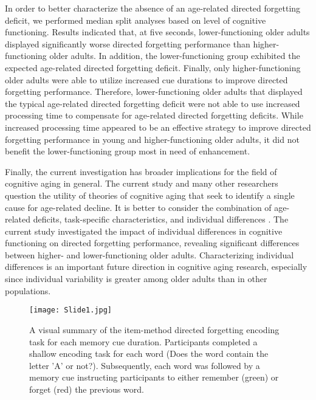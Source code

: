 \documentclass[man]{apa6}
\begin{document}
In order to better characterize the absence of an age-related directed forgetting deficit, we performed median split analyses based on level of cognitive functioning. Results indicated that, at five seconds, lower-functioning older adults displayed significantly worse directed forgetting performance than higher-functioning older adults. In addition, the lower-functioning group exhibited the expected age-related directed forgetting deficit. Finally, only higher-functioning older adults were able to utilize increased cue durations to improve directed forgetting performance. Therefore, lower-functioning older adults that displayed the typical age-related directed forgetting deficit were not able to use increased processing time to compensate for age-related directed forgetting deficits. While increased processing time appeared to be an effective strategy to improve directed forgetting performance in young and higher-functioning older adults, it did not benefit the lower-functioning group most in need of enhancement. 

Finally, the current investigation has broader implications for the field of cognitive aging in general. The current study and many other researchers question the utility of theories of cognitive aging that seek to identify a single cause for age-related decline. It is better to consider the combination of age-related deficits, task-specific characteristics, and individual differences \parencite{albinet.et.al2012}. The current study investigated the impact of individual differences in cognitive functioning on directed forgetting performance, revealing significant differences between higher- and lower-functioning older adults. Characterizing individual differences is an important future direction in cognitive aging research, especially since individual variability is greater among older adults than in other populations. 

\printbibliography


\begin{figure}
    \centering
    \texttt{[image: Slide1.jpg]}
    \caption{A visual summary of the item-method directed forgetting encoding task for each memory cue duration. Participants completed a shallow encoding task for each word (Does the word contain the letter 'A' or not?). Subsequently, each word was followed by a memory cue instructing participants to either remember (green) or forget (red) the previous word.}
    \label{fig:1}
\end{figure}
\end{document}
